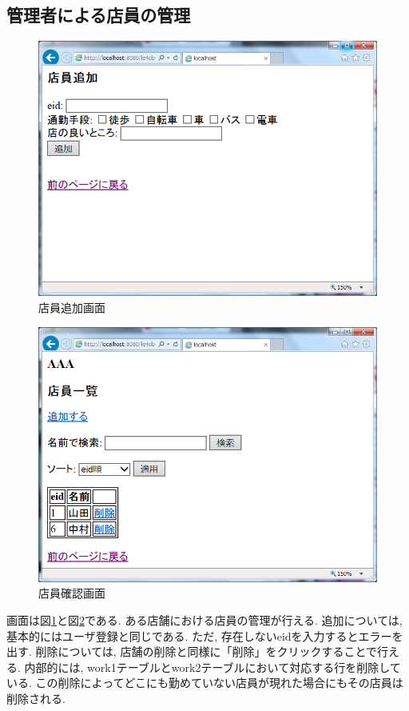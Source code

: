 \documentclass{jarticle}
\begin{document}
\subsection{管理者による店員の管理}
\begin{figure}[tp]
\begin{center}
\includegraphics[scale=0.5]{get_clerk.png}
\end{center}
\caption{店員追加画面}
\label{fig:get_clerk}
\end{figure}
\begin{figure}[tp]
\begin{center}
\includegraphics[scale=0.5]{remove_clerk.png}
\end{center}
\caption{店員確認画面}
\label{fig:remove_clerk}
\end{figure}
画面は図\ref{fig:get_clerk}と図\ref{fig:remove_clerk}である. ある店舗における店員の管理が行える. 追加については, 基本的にはユーザ登録と同じである. ただ, 存在しないeidを入力するとエラーを出す. 削除については, 店舗の削除と同様に「削除」をクリックすることで行える. 内部的には, work1テーブルとwork2テーブルにおいて対応する行を削除している. この削除によってどこにも勤めていない店員が現れた場合にもその店員は削除される.
\end{document}
